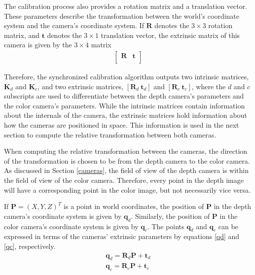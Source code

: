 The calibration process also provides a rotation matrix and a translation vector. These parameters describe
the transformation between the world's coordinate system and the camera's coordinate system. If 
$\mathbf{R}$ denotes the $3 \times 3$ rotation matrix, and $\mathbf{t}$ denotes the $3 \times 1$ 
translation vector, the extrinsic matrix of this camera is given by the $3 \times 4$ matrix 
\begin{align} \label{extrinsicmatrix}
\begin{bmatrix} \mathbf{R} & \mathbf{t} \\ \end{bmatrix}
\end{align}

Therefore, the synchronized calibration algorithm outputs two intrinsic matrices, $\mathbf{K}_d$ and 
$\mathbf{K}_c$, and two extrinsic matrices, $[ \mathbf{R}_d ~ \mathbf{t}_d ]$ and 
$[ \mathbf{R}_c ~ \mathbf{t}_c ]$, where the $d$ and $c$ subscripts are used to differentiate between the 
depth camera's parameters and the color camera's parameters. While the intrinsic matrices contain 
information about the internals of the camera, the extrinsic matrices hold information about how the 
cameras are positioned in space. This information is used in the next section to compute the relative 
transformation between both cameras. 

When computing the relative transformation between the cameras, the direction of the transformation is 
chosen to be from the depth camera to the color camera. As discussed in Section \ref{cameras}, the field
of view of the depth camera is within the field of view of the color camera. Therefore, every point in the depth
image will have a corresponding point in the color image, but not necessarily vice versa.

If $\mathbf{P} = (X, Y, Z)^T$ is a point in world coordinates, the position of $\mathbf{P}$ in the depth 
camera's coordinate system is given by $\mathbf{q}_d$. Similarly, the position of $\mathbf{P}$ in the color 
camera's coordinate system is given by $\mathbf{q}_c$. The points $\mathbf{q}_d$ and $\mathbf{q}_c$ 
can be expressed in terms of the cameras' extrinsic parameters by equations \eqref{qd} and \eqref{qc}, 
respectively.
\begin{align}
\mathbf{q}_d = \mathbf{R}_d \mathbf{P} + \mathbf{t}_d	\label{qd} \\
\mathbf{q}_c = \mathbf{R}_c \mathbf{P} + \mathbf{t}_c  	\label{qc}
\end{align}

